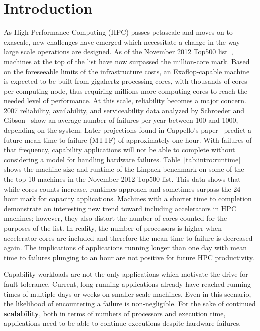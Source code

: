 \chapter{Introduction}\label{chap:intro}

As High Performance Computing (HPC) passes petascale and moves on to exascale, new
challenges have emerged which necessitate a change in the way large scale
operations are designed. As of the November 2012 Top500
list~\cite{Nov12Top500}, machines at the top of the list have now
surpassed the million-core mark. Based on the foreseeable limits of the
infrastructure costs, an Exaflop-capable machine is expected to be built from
gigahertz processing cores, with thousands of cores per computing node, thus
requiring millions more computing cores to reach the needed level of performance. At this scale,
reliability becomes a major concern. 2007 reliability, availability, and
serviceability data analyzed by Schroeder and Gibson~\cite{Schroeder:2007tp}
show an average number of failures per year between 100 and 1000, depending on
the system. Later projections found in Cappello's paper~\cite{Cappello:2009dd}
predict a future mean time to failure (MTTF) of approximately one hour. With failures
of that frequency, capability applications will not be able to complete without
considering a model for handling hardware failures. 
Table~\ref{tab:intro:runtime} shows the machine size and runtime of the Linpack 
benchmark on some of the the top 10 machines in the November 2012 Top500 list. 
This data shows that while cores counts increase, 
runtimes approach and sometimes surpass the 24 hour mark for capacity 
applications. Machines with a shorter time to completion demonstrate an 
interesting new trend toward including accelerators in HPC machines; however, 
they also distort the number of cores counted for the purposes of the list. In 
reality, the number of processors is higher when accelerator cores are included 
and therefore the mean time to failure is decreased again. The implications of 
applications running longer than one day with mean time to failures plunging to 
an hour are not positive for future HPC productivity. 

Capability workloads are not 
the only applications which motivate the drive for fault tolerance. Current, 
long running applications already have reached running times of multiple days or 
weeks on smaller scale machines. Even in this scenario, the likelihood of encountering a failure is 
non-negligible. For the sake of continued \textbf{scalability}, both in terms of 
numbers of processors and execution time, applications need to be able to 
continue executions despite hardware failures.

